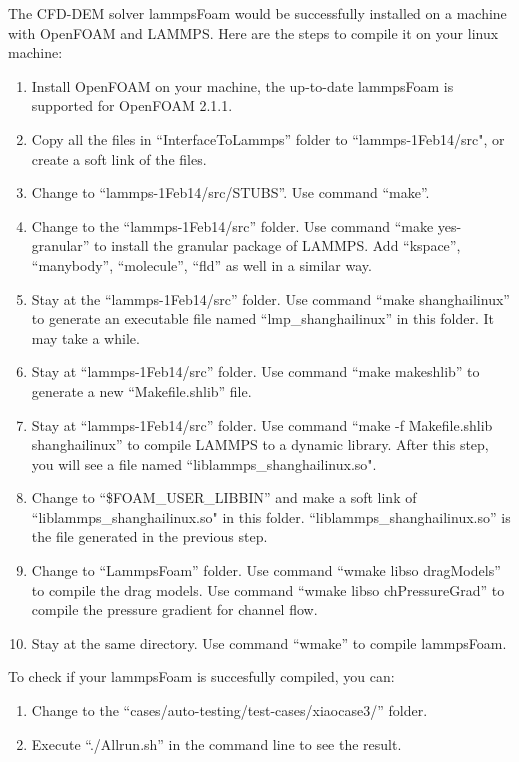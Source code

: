 \documentclass[11pt]{article}
\begin{document}
The CFD-DEM solver lammpsFoam would be successfully installed on a machine with OpenFOAM and LAMMPS.
Here are the steps to compile it on your linux machine:
\begin{enumerate}
    \item Install OpenFOAM on your machine, the up-to-date lammpsFoam is supported for OpenFOAM
        2.1.1.
    \item Copy all the files in ``InterfaceToLammps'' folder to ``lammps-1Feb14/src", or create a
        soft link of the files.
    \item Change to ``lammps-1Feb14/src/STUBS''. Use command ``make''.
    \item Change to the ``lammps-1Feb14/src'' folder. Use command ``make yes-granular'' to install
        the granular package of LAMMPS. Add ``kspace'', ``manybody'', ``molecule'', ``fld'' as well
        in a similar way.
    \item Stay at the ``lammps-1Feb14/src'' folder. Use command ``make shanghailinux'' to
        generate an executable file named ``lmp\_shanghailinux'' in this folder. It may take a
        while.
    \item Stay at ``lammps-1Feb14/src'' folder. Use command ``make makeshlib'' to generate a new
        ``Makefile.shlib'' file.
    \item Stay at ``lammps-1Feb14/src'' folder. Use command ``make -f Makefile.shlib shanghailinux''
        to compile LAMMPS to a dynamic library. After this step, you will see a file named
        ``liblammps\_shanghailinux.so".
    \item Change to ``\$FOAM\_USER\_LIBBIN'' and make a soft link of ``liblammps\_shanghailinux.so"
        in this folder. ``liblammps\_shanghailinux.so'' is the file generated in the previous step.
    \item Change to ``LammpsFoam'' folder. Use command ``wmake libso dragModels'' to compile the
        drag models. Use command ``wmake libso chPressureGrad'' to compile the pressure gradient for
        channel flow.
    \item Stay at the same directory. Use command ``wmake'' to compile lammpsFoam.
\end{enumerate}

To check if your lammpsFoam is succesfully compiled, you can:
\begin{enumerate}
    \item Change to the ``cases/auto-testing/test-cases/xiaocase3/'' folder. 
    \item Execute ``./Allrun.sh'' in the command line to see the result.
\end{enumerate}
\end{document}

